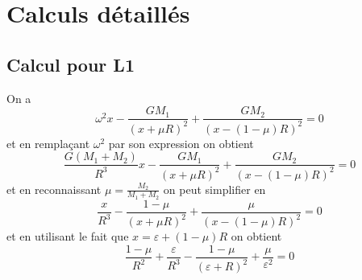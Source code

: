 \documentclass[12pt]{article}
\theoremstyle{definition}
\theoremstyle{definition}
\begin{document}
	
	
	
	
	
	\clearpage
	\section*{Calculs détaillés}
	\subsection*{Calcul pour L1}
	On a
	\begin{equation*}
		\omega^2x - \frac{GM_1}{(x+\mu R)^2} + \frac{GM_2}{(x-(1-\mu)R)^2} = 0
	\end{equation*}
	et en remplaçant $\omega^2$ par son expression on obtient
	\begin{equation*}
		\frac{G(M_1 + M_2)}{R^3}x - \frac{GM_1}{(x+\mu R)^2} + \frac{GM_2}{(x-(1-\mu)R)^2} = 0
	\end{equation*}
	et en reconnaissant $\mu = \frac{M_2}{M_1+M_2}$ on peut simplifier en
	\begin{equation*}
		\frac{x}{R^3} - \frac{1-\mu}{(x+\mu R)^2} + \frac{\mu}{(x-(1-\mu)R)^2} = 0
	\end{equation*}
	et en utilisant le fait que $x=\varepsilon + (1-\mu)R$ on obtient
	\begin{equation*}
		\frac{1-\mu}{R^2} + \frac{\varepsilon}{R^3} - \frac{1-\mu}{(\varepsilon+R)^2} + \frac{\mu}{\varepsilon^2} = 0
	\end{equation*}
	
\end{document}
